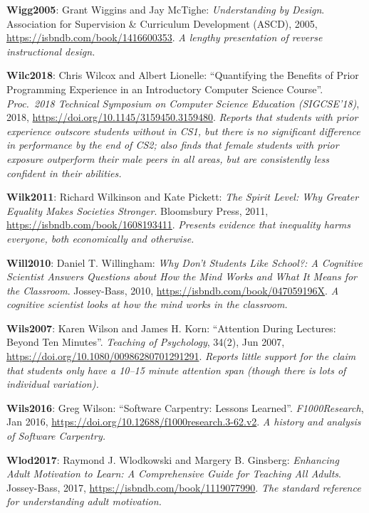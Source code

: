 \textbf{\hypertarget{b:Wigg2005}{Wigg2005}\label{b:Wigg2005}}: Grant Wiggins and Jay McTighe: \emph{Understanding by Design}. Association for Supervision \& Curriculum Development (ASCD), 2005, \url{https://isbndb.com/book/1416600353}. \emph{A lengthy presentation of reverse instructional design.}

\textbf{\hypertarget{b:Wilc2018}{Wilc2018}\label{b:Wilc2018}}: Chris Wilcox and Albert Lionelle: ``Quantifying the Benefits of Prior Programming Experience in an Introductory Computer Science Course''. \emph{Proc.\ 2018 Technical Symposium on Computer Science Education (SIGCSE'18)}, 2018, \url{https://doi.org/10.1145/3159450.3159480}. \emph{Reports that students with prior experience outscore students without in CS1, but there is no significant difference in performance by the end of CS2; also finds that female students with prior exposure outperform their male peers in all areas, but are consistently less confident in their abilities.}

\textbf{\hypertarget{b:Wilk2011}{Wilk2011}\label{b:Wilk2011}}: Richard Wilkinson and Kate Pickett: \emph{The Spirit Level: Why Greater Equality Makes Societies Stronger}. Bloomsbury Press, 2011, \url{https://isbndb.com/book/1608193411}. \emph{Presents evidence that inequality harms everyone, both economically and otherwise.}

\textbf{\hypertarget{b:Will2010}{Will2010}\label{b:Will2010}}: Daniel T. Willingham: \emph{Why Don't Students Like School?: A Cognitive Scientist Answers Questions about How the Mind Works and What It Means for the Classroom}. Jossey-Bass, 2010, \url{https://isbndb.com/book/047059196X}. \emph{A cognitive scientist looks at how the mind works in the classroom.}

\textbf{\hypertarget{b:Wils2007}{Wils2007}\label{b:Wils2007}}: Karen Wilson and James H. Korn: ``Attention During Lectures: Beyond Ten Minutes''. \emph{Teaching of Psychology}, 34(2), Jun 2007, \url{https://doi.org/10.1080/00986280701291291}. \emph{Reports little support for the claim that students only have a 10--15 minute attention span (though there is lots of individual variation).}

\textbf{\hypertarget{b:Wils2016}{Wils2016}\label{b:Wils2016}}: Greg Wilson: ``Software Carpentry: Lessons Learned''. \emph{F1000Research}, Jan 2016, \url{https://doi.org/10.12688/f1000research.3-62.v2}. \emph{A history and analysis of Software Carpentry.}

\textbf{\hypertarget{b:Wlod2017}{Wlod2017}\label{b:Wlod2017}}: Raymond J. Wlodkowski and Margery B. Ginsberg: \emph{Enhancing Adult Motivation to Learn: A Comprehensive Guide for Teaching All Adults}. Jossey-Bass, 2017, \url{https://isbndb.com/book/1119077990}. \emph{The standard reference for understanding adult motivation.}

